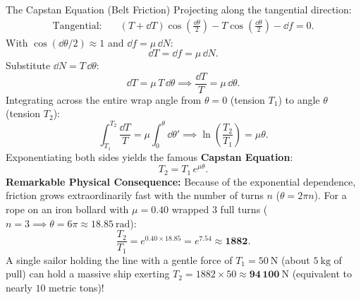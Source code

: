 \begin{workedexample}{The Capstan Equation (Belt Friction)}
Projecting along the tangential direction:
\begin{align*}
\text{Tangential:}\quad & (T + \dd T)\cos\left(\frac{\dd\theta}{2}\right) - T\cos\left(\frac{\dd\theta}{2}\right) - \dd f = 0.
\end{align*}
With $\cos(\dd\theta/2) \approx 1$ and $\dd f = \mu\,\dd N$:
\[
\dd T = \dd f = \mu\,\dd N.
\]
Substitute $\dd N = T\,\dd\theta$:
\[
\dd T = \mu\,T\,\dd\theta \implies \frac{\dd T}{T} = \mu\,\dd\theta.
\]
Integrating across the entire wrap angle from $\theta = 0$ (tension $T_1$) to angle $\theta$ (tension $T_2$):
\[
\int_{T_1}^{T_2} \frac{\dd T}{T} = \mu\int_0^\theta \dd\theta' \implies \ln\left(\frac{T_2}{T_1}\right) = \mu\theta.
\]
Exponentiating both sides yields the famous \textbf{Capstan Equation}:
\[
\boxed{T_2 = T_1\,e^{\mu\theta}.}
\]
\textbf{Remarkable Physical Consequence:}
Because of the exponential dependence, friction grows extraordinarily fast with the number of turns $n$ ($\theta = 2\pi n$).
For a rope on an iron bollard with $\mu = 0.40$ wrapped $3$ full turns ($n = 3 \implies \theta = 6\pi \approx 18.85\ \mathrm{rad}$):
\[
\frac{T_2}{T_1} = e^{0.40\times 18.85} = e^{7.54} \approx \mathbf{1882.}
\]
A single sailor holding the line with a gentle force of $T_1 = 50\ \mathrm{N}$ (about $5\ \mathrm{kg}$ of pull) can hold a massive ship exerting $T_2 = 1882\times 50 \approx \mathbf{94\,100\ \mathrm{N}}$ (equivalent to nearly $10$ metric tons)!
\end{workedexample}

